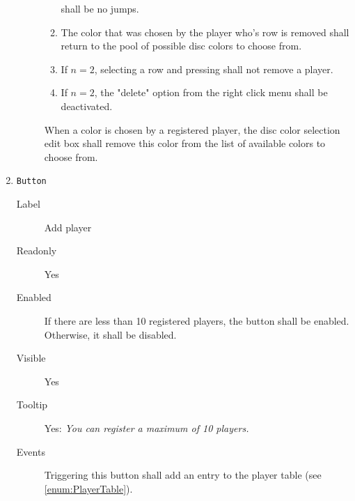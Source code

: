 \begin{enumerate}
\begin{description}
\begin{enumerate}
                                          shall be no jumps.
                                    \item The color that was chosen by the player who's
                                          row is removed shall return to the pool of possible
                                          disc colors to choose from.
                                    \item If $n = 2$, selecting a row and pressing \Del
                                          shall not remove a player.
                                    \item If $n = 2$, the "delete" option from the right
                                          click menu shall be deactivated.
                                \end{enumerate}
                                When a color is chosen by a registered player, the disc
                                color selection edit box shall remove this color from
                                the list of available colors to choose from.
              \end{description}

    \item \texttt{Button} \label{enum:AddPlayer}
              \begin{description}
                  \item[Label] Add player
                  \item[Readonly] Yes
                  \item[Enabled] If there are less than 10 registered players, the
                                 button shall be enabled. Otherwise, it shall be disabled.
                  \item[Visible] Yes
                  \item[Tooltip] Yes: \textit{You can register a maximum of 10 players.}
                  \item[Events] Triggering this button shall add an entry to the player
                                table (see \cref{enum:PlayerTable}).
              \end{description}


\end{enumerate}
